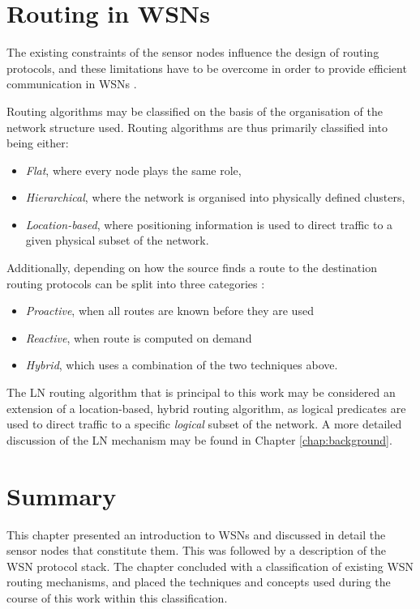 \section {Routing in WSNs}

The existing constraints of the sensor nodes influence the design of routing
protocols, and these limitations have to be overcome in order to provide
efficient communication in WSNs \cite{routing:2004}.

Routing algorithms may be classified on the basis of the organisation of
the network structure used. Routing algorithms are thus primarily classified into being either:
\begin{itemize}
\item \emph{Flat}, where every node plays the same role, 
\item \emph{Hierarchical}, where the network is organised into physically
defined clusters,
\item \emph{Location-based}, where positioning information is used to direct traffic to a given physical subset of
the network.
\end{itemize}

Additionally, depending on how the source finds a route to the destination
routing protocols can be split into three categories \cite{routing:2004}:
\begin{itemize}
	\item \emph{Proactive}, when all routes are known before they are used
	\item \emph{Reactive}, when route is computed on demand 
	\item \emph{Hybrid}, which uses a combination of the two techniques above.
\end{itemize}

The LN routing algorithm that is principal to this work may be considered an
extension of a location-based, hybrid routing algorithm, as logical predicates
are used to direct traffic to a specific \emph{logical} subset of the network. A more
detailed discussion of the LN mechanism may be found in
Chapter \ref{chap:background}.

\section{Summary}
This chapter presented an introduction to WSNs and discussed in detail the 
sensor nodes that constitute them. This was followed by a description of the WSN
protocol stack. The chapter concluded with a classification of
existing WSN routing mechanisms, and placed the techniques and concepts used during the course of
this work within this classification.


